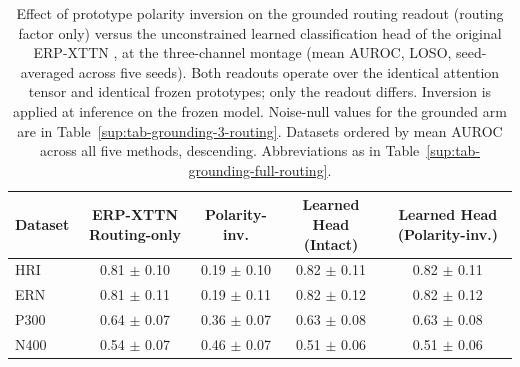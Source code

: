 \begin{table}[t]
\centering
\setlength{\tabcolsep}{6pt}
\caption{%
Effect of prototype polarity inversion on the grounded routing readout (routing factor only) versus the unconstrained learned classification head of the original ERP-XTTN \cite{wyman2026}, at the three-channel montage (mean AUROC, LOSO, seed-averaged across five seeds). Both readouts operate over the identical attention tensor and identical frozen prototypes; only the readout differs. Inversion is applied at inference on the frozen model. Noise-null values for the grounded arm are in Table~\ref{sup:tab-grounding-3-routing}. Datasets ordered by mean AUROC across all five methods, descending. Abbreviations as in Table~\ref{sup:tab-grounding-full-routing}.%
}
\label{sup:tab-polarity-contrast}
\begin{tabular}{lcccc}
\toprule
Dataset & ERP-XTTN Routing-only & Polarity-inv. & Learned Head (Intact) & Learned Head (Polarity-inv.) \\
\midrule
HRI & 0.81 $\pm$ 0.10 & 0.19 $\pm$ 0.10 & 0.82 $\pm$ 0.11 & 0.82 $\pm$ 0.11 \\
ERN & 0.81 $\pm$ 0.11 & 0.19 $\pm$ 0.11 & 0.82 $\pm$ 0.12 & 0.82 $\pm$ 0.12 \\
P300 & 0.64 $\pm$ 0.07 & 0.36 $\pm$ 0.07 & 0.63 $\pm$ 0.08 & 0.63 $\pm$ 0.08 \\
N400 & 0.54 $\pm$ 0.07 & 0.46 $\pm$ 0.07 & 0.51 $\pm$ 0.06 & 0.51 $\pm$ 0.06 \\
\bottomrule
\end{tabular}
\end{table}
